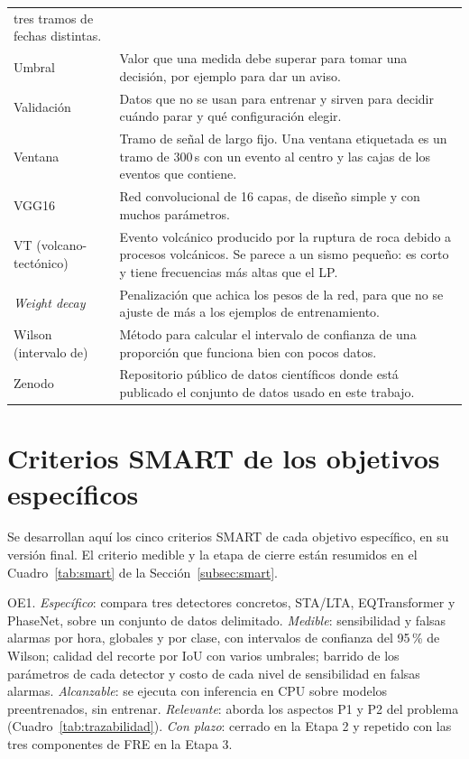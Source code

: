 {\begin{longtable}{>{\raggedright\arraybackslash}p{3.4cm}>{\raggedright\arraybackslash}p{9.4cm}}
tres tramos de fechas distintas. \\
Umbral & Valor que una medida debe superar para tomar una decisión, por
ejemplo para dar un aviso. \\
Validación & Datos que no se usan para entrenar y sirven para decidir cuándo
parar y qué configuración elegir. \\
Ventana & Tramo de señal de largo fijo. Una ventana etiquetada es un tramo de
300\,s con un evento al centro y las cajas de los eventos que contiene. \\
VGG16 & Red convolucional de 16 capas, de diseño simple y con muchos
parámetros. \\
VT (volcano-tectónico) & Evento volcánico producido por la ruptura de roca
debido a procesos volcánicos. Se parece a un sismo pequeño: es corto y tiene
frecuencias más altas que el LP. \\
\emph{Weight decay} & Penalización que achica los pesos de la red, para que no
se ajuste de más a los ejemplos de entrenamiento. \\
Wilson (intervalo de) & Método para calcular el intervalo de confianza de una
proporción que funciona bien con pocos datos. \\
Zenodo & Repositorio público de datos científicos donde está publicado el
conjunto de datos usado en este trabajo. \\
\end{longtable}
}

\section{Criterios SMART de los objetivos específicos}
\label{sec:anexo-smart}

Se desarrollan aquí los cinco criterios SMART de cada objetivo específico, en
su versión final. El criterio medible y la etapa de cierre están resumidos en
el Cuadro~\ref{tab:smart} de la Sección~\ref{subsec:smart}.

OE1. \emph{Específico}: compara tres detectores concretos, STA/LTA,
EQTransformer y PhaseNet, sobre un conjunto de datos delimitado.
\emph{Medible}: sensibilidad y falsas alarmas por hora, globales y por clase,
con intervalos de confianza del 95\,\% de Wilson; calidad del recorte por IoU
con varios umbrales; barrido de los parámetros de cada detector y costo de cada
nivel de sensibilidad en falsas alarmas. \emph{Alcanzable}: se ejecuta con
inferencia en CPU sobre modelos preentrenados, sin entrenar.
\emph{Relevante}: aborda los aspectos P1 y P2 del problema
(Cuadro~\ref{tab:trazabilidad}). \emph{Con plazo}: cerrado en la Etapa 2 y
repetido con las tres componentes de FRE en la Etapa 3.

